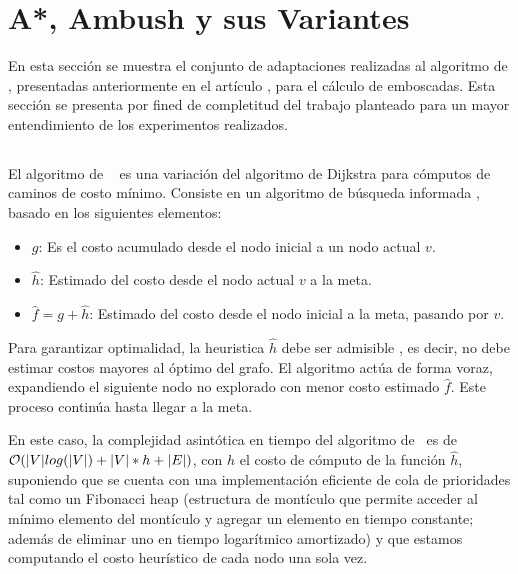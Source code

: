 \section{A*, A\*mbush y sus Variantes}
\label{sec:ambush}

En esta secci\'on se muestra el conjunto de adaptaciones realizadas
al algoritmo de \astar, presentadas anteriormente en el art\'iculo
\cite{FGC12e}, para el c\'alculo de emboscadas. Esta secci\'on se
presenta por fined de completitud del trabajo planteado para un
mayor entendimiento de los experimentos realizados.

\subsection{\astar}

El algoritmo de \astar\ \cite{HNR72}\cite{RN93}\cite{MF09}
es una variación del algoritmo de Dijkstra \cite{CLRS09}
para cómputos de caminos de costo mínimo.
Consiste en un algoritmo de búsqueda informada \cite{RN93},
basado en los siguientes elementos:

\begin{itemize}
\item $g$: Es el costo acumulado desde el nodo inicial a un nodo actual $v$.
\item $\hat{h}$: Estimado del costo desde el nodo actual $v$ a la meta.
\item $\hat{f} = g + \hat{h}$: Estimado del costo desde el nodo inicial a la meta, pasando por $v$.
\end{itemize}

Para garantizar optimalidad, la heuristica $\hat{h}$ debe
ser admisible \cite{HNR72}, es decir, no debe estimar
costos mayores al óptimo del grafo.
El algoritmo actúa de forma voraz, expandiendo el 
si\-guien\-te nodo no explorado con menor costo estimado $\hat{f}$.
Este proceso continúa hasta llegar a la meta. 

En este caso, la complejidad asintótica en tiempo
del algoritmo de \astar\ es de $\mathcal{O}(|V|log(|V|) + |V|*h + |E|)$,
con $h$ el costo de cómputo de la función $\hat{h}$,
suponiendo que se cuenta con una implementación eficiente de
cola de prioridades tal como un Fibonacci heap \cite{CLRS09} (estructura
de montículo que permite acceder al mínimo elemento del montículo
y agregar un elemento en tiempo constante; además de
e\-li\-mi\-nar uno en tiempo logarítmico amortizado) y que estamos
computando el costo heurístico de cada nodo una sola vez.

\subsection{\ambush}

